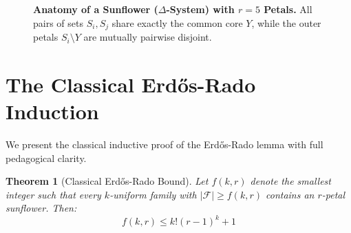 \documentclass[11pt,a4paper]{article}
\newtheorem{theorem}{Theorem}[section]
\theoremstyle{definition}
\begin{document}
\begin{figure}[htbp]
\centering
{}
\caption{\textbf{Anatomy of a Sunflower ($\Delta$-System) with $r = 5$ Petals.} All pairs of sets $S_i, S_j$ share exactly the common core $Y$, while the outer petals $S_i \setminus Y$ are mutually pairwise disjoint.}
\label{fig:sunflower_anatomy}
\end{figure}

\section{The Classical Erd\H{o}s-Rado Induction}

We present the classical inductive proof of the Erd\H{o}s-Rado lemma with full pedagogical clarity.

\begin{theorem}[Classical Erd\H{o}s-Rado Bound]\label{thm:erdos_rado_classical}
Let $f(k, r)$ denote the smallest integer such that every $k$-uniform family with $|\mathcal{F}| \ge f(k, r)$ contains an $r$-petal sunflower. Then:
\begin{equation}\label{eq:classical_bound}
f(k, r) \le k!(r - 1)^k + 1
\end{equation}
\end{theorem}
\end{document}
